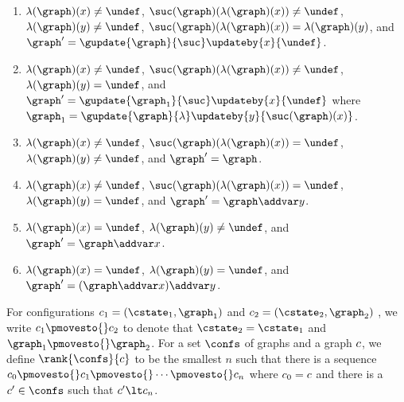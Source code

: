 \begin{enumerate}
\begin{enumerate}
\item
$\labeling(\graph)(\xvar)\neq\undef$,
$\suc(\graph)(\labeling(\graph)(\xvar))\neq\undef$,
$\labeling(\graph)(\yvar)\neq\undef$,
$\suc(\graph)(\labeling(\graph)(\xvar))=\labeling(\graph)(\yvar)$, and
$\graph'=\gupdate{\graph}{\suc}\updateby{\xvar}{\undef}$.
\item
$\labeling(\graph)(\xvar)\neq\undef$,
$\suc(\graph)(\labeling(\graph)(\xvar))\neq\undef$,
$\labeling(\graph)(\yvar)=\undef$, and
$\graph'=\gupdate{\graph_1}{\suc}\updateby{\xvar}{\undef}$ where
$\graph_1=\gupdate{\graph}{\labeling}\updateby{\yvar}{\suc(\graph)(\xvar)}$.
\item
$\labeling(\graph)(\xvar)\neq\undef$,
$\suc(\graph)(\labeling(\graph)(\xvar))=\undef$,
$\labeling(\graph)(\yvar)\neq\undef$, and
$\graph'=\graph$.
\item
$\labeling(\graph)(\xvar)\neq\undef$,
$\suc(\graph)(\labeling(\graph)(\xvar))=\undef$,
$\labeling(\graph)(\yvar)=\undef$, and
$\graph'=\graph\addvar\yvar$.
\item
$\labeling(\graph)(\xvar)=\undef$,
$\labeling(\graph)(\yvar)\neq\undef$, and
$\graph'=\graph\addvar\xvar$.
\item
$\labeling(\graph)(\xvar)=\undef$,
$\labeling(\graph)(\yvar)=\undef$, and
$\graph'=(\graph\addvar\xvar)\addvar\yvar$.
\end{enumerate}

\end{enumerate}




For configurations $\conf_1=\tuple{\cstate_1,\graph_1}$ and $\conf_2=\tuple{\cstate_2,\graph_2}$ ,
we write $\conf_1\pmovesto{}\conf_2$ to denote that $\cstate_2=\cstate_1$ and $\graph_1\pmovesto{}\graph_2$.
%
For a set $\confs$ of graphs and a graph $c$, we define $\rank{\confs}{\conf}$
to be the smallest $n$ such that there is a sequence
$\conf_0\pmovesto{}\conf_1\pmovesto{}\cdots\pmovesto{}\conf_n$
where $c_0=c$ and there is a $\conf'\in\confs$ such that $\conf'\lt\conf_n$.


